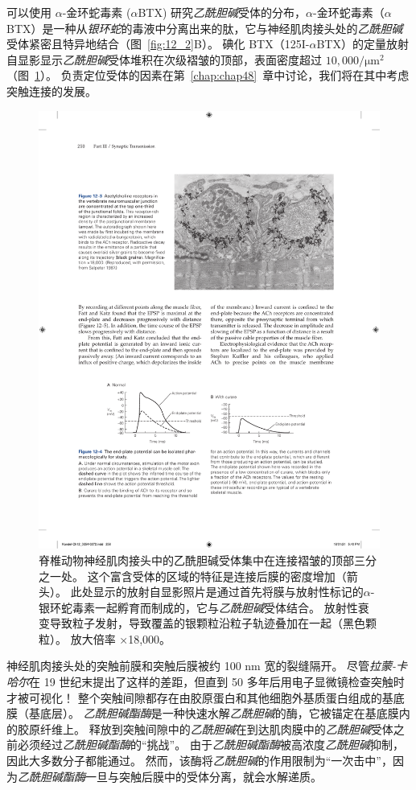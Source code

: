 可以使用 $\alpha$-金环蛇毒素 ($\alpha$BTX) 研究\textit{乙酰胆碱}受体的分布，$\alpha$-金环蛇毒素（$\alpha$BTX）是一种从\textit{银环蛇}的毒液中分离出来的肽，它与神经肌肉接头处的\textit{乙酰胆碱}受体紧密且特异地结合（图~\ref{fig:12_2}B）。 
碘化 BTX（125I-$\alpha$BTX）的定量放射自显影显示\textit{乙酰胆碱}受体堆积在次级褶皱的顶部，表面密度超过 $10,000/\mathrm{\mu m}^2$
（图~\ref{fig:12_3}）。
负责定位受体的因素在第~\ref{chap:chap48}~章中讨论，我们将在其中考虑突触连接的发展。


\begin{figure}[htbp]
	\centering
	\includegraphics[width=0.75\linewidth]{chap12/fig_12_3}
	\caption{脊椎动物神经肌肉接头中的乙酰胆碱受体集中在连接褶皱的顶部三分之一处。
		这个富含受体的区域的特征是连接后膜的密度增加（箭头）。
		此处显示的放射自显影照片是通过首先将膜与放射性标记的$\alpha$-银环蛇毒素一起孵育而制成的，它与\textit{乙酰胆碱}受体结合。
		放射性衰变导致粒子发射，导致覆盖的银颗粒沿粒子轨迹叠加在一起（黑色颗粒）。
		放大倍率 ×18,000。}
	\label{fig:12_3}
\end{figure}



神经肌肉接头处的突触前膜和突触后膜被约 100 nm 宽的裂缝隔开。
尽管\textit{拉蒙-卡哈尔}在 19 世纪末提出了这样的差距，但直到 50 多年后用电子显微镜检查突触时才被可视化！
整个突触间隙都存在由胶原蛋白和其他细胞外基质蛋白组成的基底膜（基底层）。
\textit{乙酰胆碱酯酶}是一种快速水解\textit{乙酰胆碱}的酶，它被锚定在基底膜内的胶原纤维上。
释放到突触间隙中的\textit{乙酰胆碱}在到达肌肉膜中的\textit{乙酰胆碱}受体之前必须经过\textit{乙酰胆碱酯酶}的“挑战”。
由于\textit{乙酰胆碱酯酶}被高浓度\textit{乙酰胆碱}抑制，因此大多数分子都能通过。
然而，该酶将\textit{乙酰胆碱}的作用限制为“一次击中”，因为\textit{乙酰胆碱酯酶}一旦与突触后膜中的受体分离，就会水解递质。



